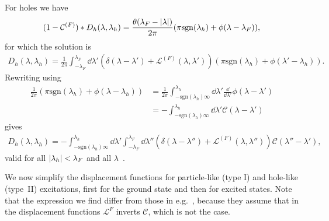 \documentclass[11pt, a4paper]{report} %
\begin{document}
For holes we have 
\begin{align}
  \label{eq:37}
  (1-\mathcal{C}^{(F)})* D_h(\lambda,\lambda_h) = \frac{\theta(\lambda_F-\abs{\lambda})}{2\pi} (\pi\mathrm{sgn}(\lambda_h) + \phi(\lambda-\lambda_F)),
\end{align}
for which the solution is 
\begin{align}
  \label{eq:38}
  D_h(\lambda,\lambda_h) = \frac{1}{2\pi} \int_{-\lambda_F}^{\lambda_F} \dd \lambda' \left(\delta(\lambda-\lambda')+\mathcal{L}^{(F)}(\lambda,\lambda')\right)(\pi\mathrm{sgn}(\lambda_h) + \phi(\lambda'-\lambda_h)).
\end{align}
Rewriting using
\begin{align}
  \label{eq:39}
  \frac{1}{2\pi} (\pi \mathrm{sgn}(\lambda_h) + \phi(\lambda-\lambda_h)) &= \frac{1}{2\pi} \int_{-\mathrm{sgn}(\lambda_h)\infty}^{\lambda_h} \dd \lambda' \frac{\dd}{\dd\lambda'} \phi(\lambda - \lambda') \\
                                                                         &= - \int_{-\mathrm{sgn}(\lambda_h)\infty}^{\lambda_h} \dd \lambda' \mathcal{C}(\lambda-\lambda')
\end{align}
gives
\begin{align}
  \label{eq:40}
  D_h(\lambda, \lambda_h) = - \int_{-\textrm{sgn}(\lambda_h)\infty}^{\lambda_h} \dd \lambda' \int_{-\lambda_F}^{\lambda_F} \dd \lambda'' \left(\delta(\lambda-\lambda'') + \mathcal{L}^{(F)}(\lambda,\lambda'') \right)\mathcal{C}(\lambda''-\lambda'),
\end{align}
valid for all \(\abs{\lambda_h}<\lambda_F\) and all \(\lambda\)~\cite{Caux2015}.

We now simplify the displacement functions for particle-like (type I) and hole-like (type~II) excitations, first for the ground state and then for excited states.
Note that the expression we find differ from those in e.g.~\cite{Korepin1993}, because they assume that in the displacement functions \(\mathcal{L}^{F}\) inverts \(\mathcal{C}\), which is not the case.
\end{document}
